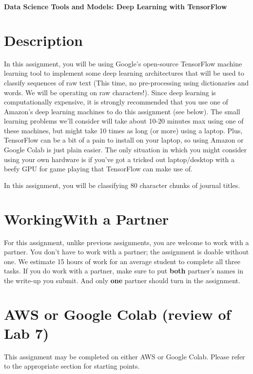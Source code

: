 \documentclass[11pt]{article}
\renewcommand\:{\colon} %
\begin{document}

\begin{center}
{\bf \huge{Data Science Tools and Models: Deep Learning with TensorFlow}}
\end{center}


\section{Description}

In this assignment, you will be using Google's open-source TensorFlow machine learning tool to implement
some deep learning architectures that will be used to classify sequences of raw text (This time, no
pre-processing using dictionaries and words. We will be operating on raw characters!). Since deep learning
is computationally expensive, it is strongly recommended that you use one of Amazon's deep learning machines
to do this assignment (see below). The small learning problems we'll consider will take about 10-20
minutes max using one of these machines, but might take 10 times as long (or more) using a laptop. Plus,
TensorFlow can be a bit of a pain to install on your laptop, so using Amazon or Google Colab is just plain easier. The only
situation in which you might consider using your own hardware is if you've got a tricked out laptop/desktop
with a beefy GPU for game playing that TensorFlow can make use of.

In this assignment, you will be classifying 80 character chunks of journal titles.

\section{WorkingWith a Partner}
For this assignment, unlike previous assignments, you are welcome to work with a partner. You don't
have to work with a partner; the assignment is doable without one. We estimate 15 hours of work for an
average student to complete all three tasks.
If you do work with a partner, make sure to put \textbf{both} partner's names in the write-up you submit.
And only \textbf{one} partner should turn in the assignment.


\section{AWS or Google Colab (review of Lab 7)}
This assignment may be completed on either AWS or Google Colab. Please refer to the appropriate section for starting points.
\end{document}
